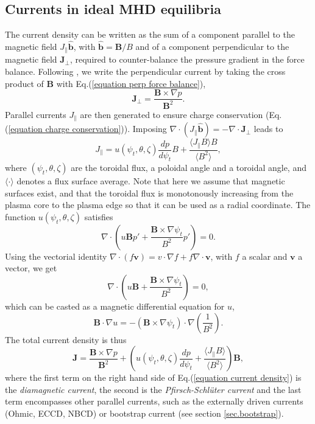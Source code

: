 \documentclass[my_thesis.tex]{subfiles}
\begin{document}
\subsection{Currents in ideal MHD equilibria}\label{sec ideal mhd currents}
The current density can be written as the sum of a component parallel to the magnetic field $J_\parallel \hat{\mathbf{b}}$, with $\hat{\mathbf{b}}=\mathbf{B}/B$ and of a component perpendicular to the magnetic field $\mathbf{J}_\perp$, required to counter-balance the pressure gradient in the force balance. Following \citet{helanderTheoryPlasmaConfinement2014}, we write the perpendicular current by taking the cross product of $\mathbf{B}$ with Eq.(\ref{equation perp force balance}),
\begin{equation}
	\mathbf{J}_\perp = \frac{\mathbf{B}\times\nabla p}{\mathbf{B}^2}.
\end{equation}
Parallel currents $J_\parallel$ are then generated to ensure charge conservation (Eq.(\ref{equation charge conservation})). Imposing $\nabla \cdot (J_\parallel\mathbf{\hat{b}}) = - \nabla\cdot\mathbf{J}_\perp$ leads to 
\begin{equation}
	J_\parallel = u(\psi_t,\theta,\zeta)\frac{dp}{d\psi_t}B + \frac{\langle J_\parallel B\rangle B}{\langle B^2\rangle},
\end{equation}
where $(\psi_t,\theta,\zeta)$ are the toroidal flux, a poloidal angle and a toroidal angle, and $\langle\cdot\rangle$ denotes a flux surface average. Note that here we assume that magnetic surfaces exist, and that the toroidal flux is monotonously increasing from the plasma core to the plasma edge so that it can be used as a radial coordinate. The function $u(\psi_t,\theta,\zeta)$ satisfies
\begin{equation}
	\nabla\cdot\left(u\mathbf{B}p'+\frac{\mathbf{B}\times\nabla\psi_t}{B^2}p'\right) = 0.
\end{equation}
Using the vectorial identity $\nabla\cdot(f\mathbf{v})=v\cdot\nabla f+f\nabla\cdot\mathbf{v}$, with $f$ a scalar and $\mathbf{v}$ a vector, we get
\begin{equation}
	\nabla\cdot\left(u\mathbf{B}+\frac{\mathbf{B}\times\nabla\psi_t}{B^2}\right) = 0, \label{eq.div_eq_u}
\end{equation}
which can be casted as a magnetic differential equation for $u$, 
\begin{equation}
	\mathbf{B}\cdot\nabla u = -(\mathbf{B}\times\nabla\psi_t)\cdot\nabla\left(\frac{1}{B^2}\right). \label{eq.diff_u}
\end{equation}
The total current density is thus
\begin{equation}
	\mathbf{J} = \frac{\mathbf{B}\times\nabla p}{\mathbf{B}^2} + \left(u(\psi_t,\theta,\zeta)\frac{dp}{d\psi_t} + \frac{\langle J_\parallel B\rangle}{\langle B^2\rangle}\right)\mathbf{B}, \label{equation current density}
\end{equation}
where the first term on the right hand side of Eq.(\ref{equation current density}) is the \emph{diamagnetic current}, the second is the \emph{Pfirsch-Schl\"uter current} and the last term encompasses other parallel currents, such as the externally driven currents (Ohmic, \ac{ECCD}, \ac{NBCD}) or bootstrap current (see section \ref{sec.bootstrap}).
\end{document}
